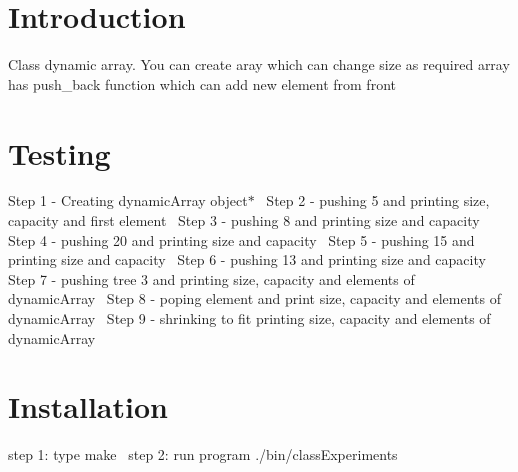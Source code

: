 \hypertarget{index_Introduction}{}\section{Introduction}\label{index_Introduction}
Class dynamic array. You can create aray which can change size as required array has push\+\_\+back function which can add new element from front\hypertarget{index_Testing}{}\section{Testing}\label{index_Testing}
Step 1 -\/ Creating dynamic\+Array object$\ast$~\newline
Step 2 -\/ pushing 5 and printing size, capacity and first element~\newline
Step 3 -\/ pushing 8 and printing size and capacity~\newline
Step 4 -\/ pushing 20 and printing size and capacity~\newline
Step 5 -\/ pushing 15 and printing size and capacity~\newline
Step 6 -\/ pushing 13 and printing size and capacity~\newline
Step 7 -\/ pushing tree 3 and printing size, capacity and elements of dynamic\+Array~\newline
Step 8 -\/ poping element and print size, capacity and elements of dynamic\+Array~\newline
Step 9 -\/ shrinking to fit printing size, capacity and elements of dynamic\+Array~\newline
 \hypertarget{index_Installation}{}\section{Installation}\label{index_Installation}
step 1\+: type make~\newline
step 2\+: run program ./bin/class\+Experiments 